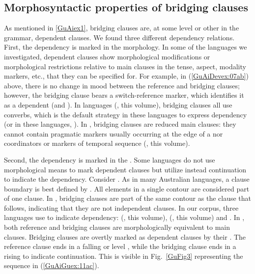 \documentclass[output=paper]{LSP/langsci}
\begin{document}
\subsection{Morphosyntactic properties of bridging clauses}
\label{GuAi2.3Morphosy.brid.cl}
As mentioned in \ref{GuAiex1}, bridging clauses are, at some level or other in the grammar, dependent clauses. We found three different dependency relations. First, the dependency is marked in the morphology. In some of the languages we investigated, dependent clauses show morphological modifications or morphological restrictions relative to main clauses in the tense, aspect, modality markers, etc., that they can be specified for. For example, in (\ref{GuAiDevex:07ab}) above, there is no change in mood between the reference and bridging clauses; however, the bridging clause bears a switch-reference marker, which identifies it as a dependent (and ). In  languages (\citeauthor{anker18}, this volume), bridging clauses all use converbs, which is the default strategy in these languages to express dependency (or in these languages, ). In , bridging clauses are reduced main clauses: they cannot contain pragmatic markers usually occurring at the edge of a  nor coordinators or markers of temporal sequence (\citeauthor{jarkey18}, this volume). 

Second, the dependency is marked in the . Some languages do not use morphological means to mark dependent clauses but utilize instead continuation  to indicate the dependency. Consider  \citep[][5, 10]{McKay.2008}. As in many Australian languages, a clause boundary is best defined by . All elements in a single  contour are considered part of one clause. In , bridging clauses are part of the same  contour as the clause that follows, indicating that they are not independent clauses. In our corpus, three languages use  to indicate dependency:  (\citeauthor{guerinchap18}, this volume),  (\citeauthor{sarvasy18}, this volume) and  \citep{Pensalfini}. In , both reference and bridging clauses are morphologically equivalent to main clauses. Bridging clauses are overtly marked as dependent clauses by their . The reference clause ends in a falling or level , while the bridging clause ends in a rising  to indicate continuation. This is visible in Fig.~\ref{GuFig3} representing the sequence in (\ref{GuAiGuex:11ac}). 
\end{document}
